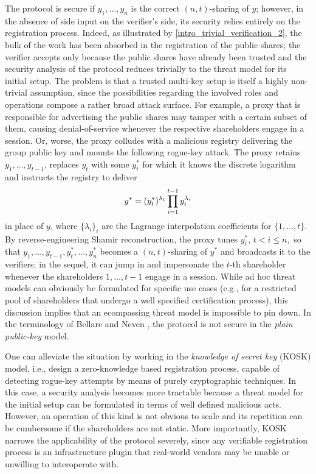 \documentclass{iacrtrans}
\begin{document}
\noindent
The protocol is secure
if $y_1, \dots, y_n$ is the correct $(n, t)$-sharing of $y$;
however, in the absence of side input
on the verifier's side,
its security relies entirely on the registration process.
Indeed, as illustrated by \eqref{intro_trivial_verification_2},
the bulk of the work has been
absorbed in the registration of the public shares;
the verifier accepts only because
the public shares have already been trusted
and the security analysis of the protocol
reduces trivially to the threat model for its initial setup.
The problem is that
a trusted multi-key setup is itself
a highly non-trivial assumption,
since the possibilities regarding
the involved roles and operations
compose a rather broad attack surface.
For example, a proxy that is responsible
for advertising the public shares
may tamper with a certain subset of them,
causing denial-of-service whenever
the respective shareholders engage
in a session.
Or, worse, the proxy colludes with
a malicious registry delivering the group public key
and mounts the following rogue-key attack.
The proxy retains $y_1, \dots, y_{t-1}$, replaces
$y_t$ with some $y_t^*$ for which it knows the discrete logarithm
and instructs the registry to deliver
\vspace{5pt}
\begin{equation*}
y^* = (y_t^*)^{\lambda_t}\prod_{i=1}^{t-1}y_i^{\lambda_i}
\vspace{5pt}
\end{equation*}
in place of $y$, where $\{\lambda_i\}_{i}$
are the Lagrange interpolation coefficients for $\{1, \dots, t\}$.
By reverse-engineering Shamir reconstruction,
the proxy tunes $y_i^*,\hspace{2pt} t < i \le n,$
so that $y_1, \dots, y_{t-1}, y_t^*, \dots, y_n^*$
becomes a $(n, t)$-sharing of $y^*$
and broadcasts it to the verifiers;
in the sequel, it can jump in and
impersonate the $t$-th shareholder
whenever the shareholders $1, \dots, t-1$ engage
in a session.
While ad hoc threat models can obviously be formulated
for specific use cases (e.g., for a restricted pool of
shareholders that undergo a well specified certification process),
this discussion implies that
an ecompassing threat model is impossible to pin down.
In the terminology of Bellare and Neven \cite{paper_bellare_musig},
the protocol is not secure
in the \textit{plain public-key} model.

One can alleviate the situation by working in the
\textit{knowledge of secret key} (KOSK) model,
i.e., design a zero-knowledge based registration process,
capable of detecting rogue-key attempts
by means of purely cryptographic techniques.
In this case, a security analysis becomes more tractable
because a threat model for the initial setup can be
formulated in terms of well defined malicious acts.
However, an operation of this kind is not obvious to scale
and its repetition can be cumbersome
if the shareholders are not static.
More importantly, KOSK narrows
the applicability of the protocol severely,
since any verifiable registration process
is an infrastructure plugin that real-world vendors
may be unable or unwilling to interoperate with.
\end{document}
